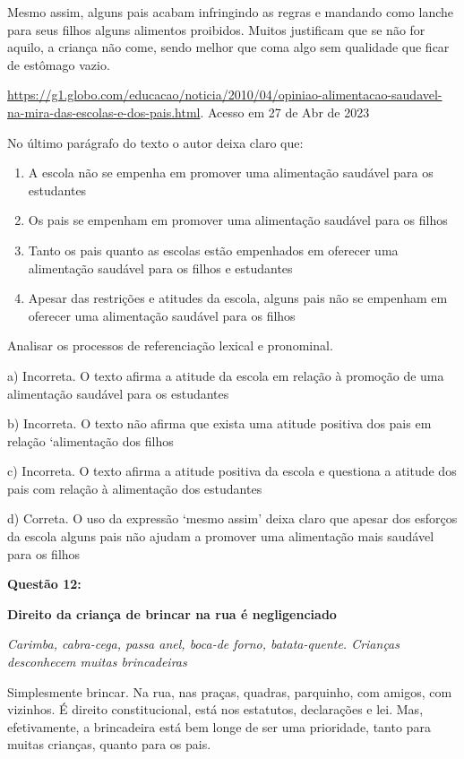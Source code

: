Mesmo assim, alguns pais acabam infringindo as regras e mandando como
lanche para seus filhos alguns alimentos proibidos. Muitos justificam
que se não for aquilo, a criança não come, sendo melhor que coma algo
sem qualidade que ficar de estômago vazio.

\href{https://g1.globo.com/educacao/noticia/2010/04/opiniao-alimentacao-saudavel-na-mira-das-escolas-e-dos-pais.html}{{https://g1.globo.com/educacao/noticia/2010/04/opiniao-alimentacao-saudavel-na-mira-das-escolas-e-dos-pais.html}}.
Acesso em 27 de Abr de 2023

No último parágrafo do texto o autor deixa claro que:

\begin{enumerate}
\def\labelenumi{\alph{enumi})}
\item
  A escola não se empenha em promover uma alimentação saudável para os
  estudantes
\item
  Os pais se empenham em promover uma alimentação saudável para os
  filhos
\item
  Tanto os pais quanto as escolas estão empenhados em oferecer uma
  alimentação saudável para os filhos e estudantes
\item
  Apesar das restrições e atitudes da escola, alguns pais não se
  empenham em oferecer uma alimentação saudável para os filhos
\end{enumerate}

Analisar os processos de referenciação lexical e pronominal.

a) Incorreta. O texto afirma a atitude da escola em relação à promoção
de uma alimentação saudável para os estudantes

b) Incorreta. O texto não afirma que exista uma atitude positiva dos
pais em relação `alimentação dos filhos

c) Incorreta. O texto afirma a atitude positiva da escola e questiona a
atitude dos pais com relação à alimentação dos estudantes

d) Correta. O uso da expressão `mesmo assim' deixa claro que apesar dos
esforços da escola alguns pais não ajudam a promover uma alimentação
mais saudável para os filhos

\textbf{Questão 12:}

\textbf{Direito da criança de brincar na rua é negligenciado}

\emph{Carimba, cabra-cega, passa anel, boca-de forno, batata-quente.
Crianças desconhecem muitas brincadeiras}

Simplesmente brincar. Na rua, nas praças, quadras, parquinho, com
amigos, com vizinhos. É direito constitucional, está nos estatutos,
declarações e lei. Mas, efetivamente, a brincadeira está bem longe de
ser uma prioridade, tanto para muitas crianças, quanto para os pais.

